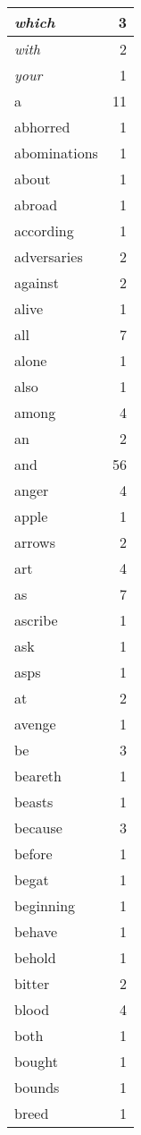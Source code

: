 \begin{center}
\begin{longtable}{l|r}
\emph{which} & 3 \\ \hline
\emph{with} & 2 \\ \hline
\emph{your} & 1 \\ \hline
a & 11 \\ \hline
abhorred & 1 \\ \hline
abominations & 1 \\ \hline
about & 1 \\ \hline
abroad & 1 \\ \hline
according & 1 \\ \hline
adversaries & 2 \\ \hline
against & 2 \\ \hline
alive & 1 \\ \hline
all & 7 \\ \hline
alone & 1 \\ \hline
also & 1 \\ \hline
among & 4 \\ \hline
an & 2 \\ \hline
and & 56 \\ \hline
anger & 4 \\ \hline
apple & 1 \\ \hline
arrows & 2 \\ \hline
art & 4 \\ \hline
as & 7 \\ \hline
ascribe & 1 \\ \hline
ask & 1 \\ \hline
asps & 1 \\ \hline
at & 2 \\ \hline
avenge & 1 \\ \hline
be & 3 \\ \hline
beareth & 1 \\ \hline
beasts & 1 \\ \hline
because & 3 \\ \hline
before & 1 \\ \hline
begat & 1 \\ \hline
beginning & 1 \\ \hline
behave & 1 \\ \hline
behold & 1 \\ \hline
bitter & 2 \\ \hline
blood & 4 \\ \hline
both & 1 \\ \hline
bought & 1 \\ \hline
bounds & 1 \\ \hline
breed & 1 \\ \hline

\end{longtable}
\end{center}
